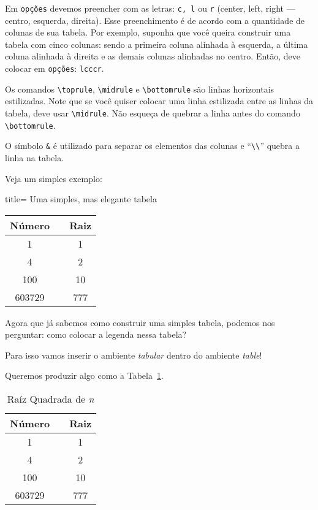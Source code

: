 Em \texttt{opções} devemos preencher com as letras: \texttt{c, l} ou \texttt{r} 
(center, left, right --- centro, esquerda, direita).
Esse preenchimento é de acordo com a quantidade de colunas de sua tabela. 
Por exemplo, suponha que você queira construir uma tabela com cinco colunas: 
sendo a primeira coluna alinhada à esquerda, a última coluna alinhada à direita 
e as demais colunas alinhadas no centro. 
Então, deve colocar em \texttt{opções}: \texttt{lcccr}.

Os comandos \Verb|\toprule|, \Verb|\midrule| e \Verb|\bottomrule| são linhas 
horizontais estilizadas.
Note que se você quiser colocar uma linha estilizada entre as linhas da tabela, 
deve usar \Verb|\midrule|.
Não esqueça de quebrar a linha antes do comando \Verb|\bottomrule|.

O símbolo \texttt{\&} é utilizado para separar os elementos das colunas e 
``\texttt{\textbackslash\textbackslash}'' quebra a linha na tabela.

Veja um simples exemplo:

\begin{tcblisting}{title= {Uma simples, mas elegante tabela}}
\begin{tabular}{ccc}
\toprule
  \textbf{Número} && \textbf{Raiz}\\
\midrule
  1      && 1\\
  4      && 2\\
  100    && 10\\
  603729 && 777\\
\bottomrule
\end{tabular}
\end{tcblisting}

Agora que já sabemos como construir uma simples tabela, podemos nos perguntar: 
como colocar a legenda nessa tabela?

Para isso vamos inserir o ambiente \textit{tabular} dentro do ambiente 
\textit{table}!

Queremos produzir algo como a Tabela~\ref{tab:raizq}.

\newpage

\begin{table}[!htbp]
  \centering
  \caption{Raíz Quadrada de \textit{n}}
  \label{tab:raizq}
  \begin{tabular}{ccc}
    \toprule
    \textbf{Número}&&\textbf{Raiz}\\
    \midrule
    1 && 1\\
    4 && 2\\
    100 && 10\\
    603729 && 777\\
   \bottomrule
  \end{tabular}
\end{table}

